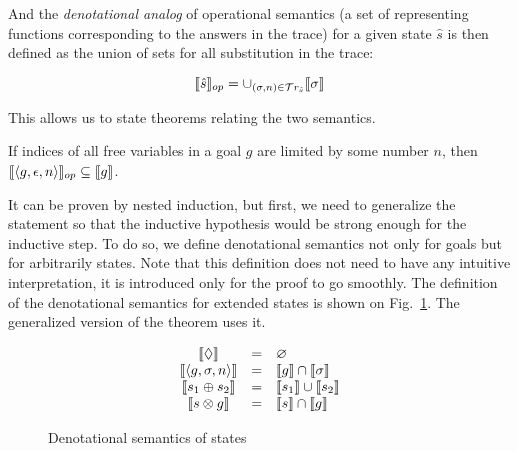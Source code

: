 And the \emph{denotational analog} of operational semantics (a set of representing functions corresponding to the answers in the trace) for a given state $\hat{s}$ is
then defined as the union of sets for all substitution in the trace:

\[
\llbracket{\hat{s}}\rrbracket_{op} = \cup_{(\sigma, n) \in \mathcal{T}r_{\hat{s}}} \llbracket{\sigma}\rrbracket
\]

\begin{comment}
In \textsc{Coq} we again use a proposition instead:

\begin{lstlisting}[language=Coq]
   Definition in_denotational_analog
      (t : trace) (f : repr_fun) : Prop :=
      exists s n, in_stream (Answer s n) t /\
             in_denotational_sem_subst s f.
   Notation "{| t , f |}" := (in_denotational_analog t f).
\end{lstlisting}
\end{comment}

This allows us to state theorems relating the two semantics.

\begin{theorem}
\label{lem:soundness}
If indices of all free variables in a goal $g$ are limited by some number $n$, then $\llbracket{\left<{g, \epsilon, n}\right>}\rrbracket_{op} \subseteq \llbracket{g}\rrbracket$.
\end{theorem}

It can be proven by nested induction, but first, we need to generalize the statement so that the inductive hypothesis would be strong enough for the inductive step.
To do so, we define denotational semantics not only for goals but for arbitrarily states. Note that this definition does not need to have any intuitive
interpretation, it is introduced only for the proof to go smoothly. The definition of the denotational semantics for extended states is shown on Fig.~\ref{denotational_semantics_of_states}.
The generalized version of the theorem uses it.

\begin{figure}[t]
  \[
  \begin{array}{ccl}
    \llbracket{\Diamond}\rrbracket&=&\varnothing\\
    \llbracket{\left<{g, \sigma, n}\right>}\rrbracket&=&\llbracket{g}\rrbracket\cap\llbracket{\sigma}\rrbracket\\
    \llbracket{s_1 \oplus s_2}\rrbracket&=&\llbracket{s_1}\rrbracket\cup\llbracket{s_2}\rrbracket\\
    \llbracket{s \otimes g}\rrbracket&=&\llbracket{s}\rrbracket\cap\llbracket{g}\rrbracket\\
  \end{array}
  \]
  \caption{Denotational semantics of states}
  \label{denotational_semantics_of_states}
\end{figure}

